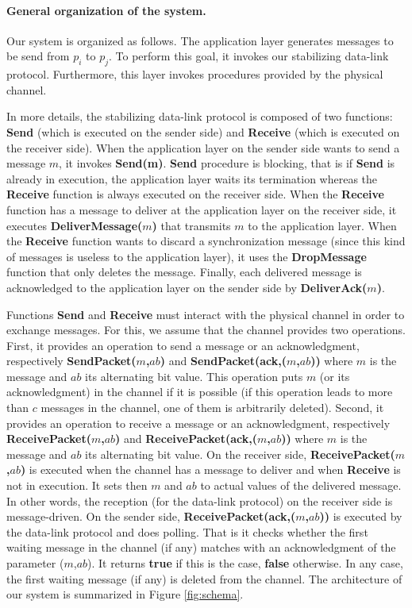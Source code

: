 \documentclass[11pt]{article}
\begin{document}
\paragraph{General organization of the system.}
Our system is organized as follows. The application layer generates messages to be send from $p_i$ to $p_j$. To perform this goal, it invokes our stabilizing data-link protocol. Furthermore, this layer invokes procedures provided by the physical channel.

In more details, the stabilizing data-link protocol is composed of two functions: \textbf{Send} (which is executed on the sender side) and \textbf{Receive} (which is executed on the receiver side). When the application layer on the sender side wants to send a message $m$, it invokes \textbf{Send(m)}. \textbf{Send} procedure is blocking, that is if \textbf{Send} is already in execution, the application layer waits its termination whereas the \textbf{Receive} function is always executed on the receiver side. When the \textbf{Receive} function has a message to deliver at the application layer on the receiver side, it executes \textbf{DeliverMessage($m$)} that transmits $m$ to the application layer. When the \textbf{Receive} function wants to discard a synchronization message (since this kind of messages is useless to the application layer), it uses the \textbf{DropMessage} function that only deletes the message. Finally, each delivered message is acknowledged to the application layer on the sender side by \textbf{DeliverAck($m$)}.

Functions \textbf{Send} and \textbf{Receive} must interact with the physical channel in order to exchange messages. For this, we assume that the channel provides two operations. First, it provides an operation to send a message or an acknowledgment, respectively \textbf{SendPacket($m$,$ab$)} and \textbf{SendPacket(ack,($m$,$ab$))} where $m$ is the message and $ab$ its alternating bit value. This operation puts $m$ (or its acknowledgment) in the channel if it is possible (if this operation leads to more than $c$ messages in the channel, one of them is arbitrarily deleted). Second, it provides an operation to receive a message or an acknowledgment, respectively \textbf{ReceivePacket($m$,$ab$)} and \textbf{ReceivePacket(ack,($m$,$ab$))} where $m$ is the message and $ab$ its alternating bit value. On the receiver side, \textbf{ReceivePacket($m$,$ab$)} is executed when the channel has a message to deliver and when \textbf{Receive} is not in execution. It sets then $m$ and $ab$ to actual values of the delivered message. In other words, the reception (for the data-link protocol) on the receiver side is message-driven. On the sender side, \textbf{ReceivePacket(ack,($m$,$ab$))} is executed by the data-link protocol and does polling. That is it checks whether the first waiting message in the channel (if any) matches with an acknowledgment of the parameter ($m$,$ab$). It returns \textbf{true} if this is the case, \textbf{false} otherwise. In any case, the first waiting message (if any) is deleted from the channel. The architecture of our system is summarized in Figure \ref{fig:schema}.
\end{document}
